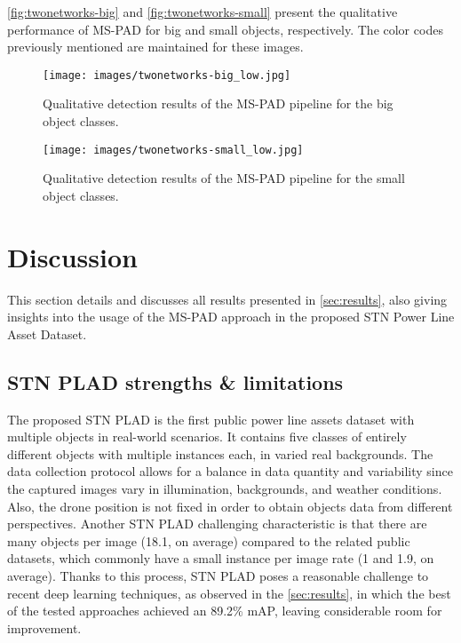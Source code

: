\documentclass[10pt,conference]{IEEEtran}
\begin{document}
\autoref{fig:twonetworks-big} and \autoref{fig:twonetworks-small} present the qualitative performance of MS-PAD for big and small objects, respectively. The color codes previously mentioned are maintained for these images.

\begin{figure}
    \centering
    \texttt{[image: images/twonetworks-big\_low.jpg]}
    \caption{Qualitative detection results of the MS-PAD pipeline for the big object classes.}
    \label{fig:twonetworks-big}
\end{figure}

\begin{figure}
    \centering
    \texttt{[image: images/twonetworks-small\_low.jpg]}
    \caption{Qualitative detection results of the MS-PAD pipeline for the small object classes.}
    \label{fig:twonetworks-small}
\end{figure}








\section{Discussion}
\label{sec:discussion}

This section details and discusses all results presented in \autoref{sec:results}, also giving insights into the usage of the MS-PAD approach in the proposed STN Power Line Asset Dataset.

\subsection{STN PLAD strengths \& limitations}

The proposed STN PLAD is the first public power line assets dataset with multiple objects in real-world scenarios. It contains five classes of entirely different objects with multiple instances each, in varied real backgrounds. The data collection protocol allows for a balance in data quantity and variability since the captured images vary in illumination, backgrounds, and weather conditions. Also, the drone position is not fixed in order to obtain objects data from different perspectives. Another STN PLAD challenging characteristic is that there are many objects per image (18.1, on average) compared to the related public datasets, which commonly have a small instance per image rate (1 and 1.9, on average). Thanks to this process, STN PLAD poses a reasonable challenge to recent deep learning techniques, as observed in the \autoref{sec:results}, in which the best of the tested approaches achieved an 89.2\% mAP, leaving considerable room for improvement.
\end{document}
